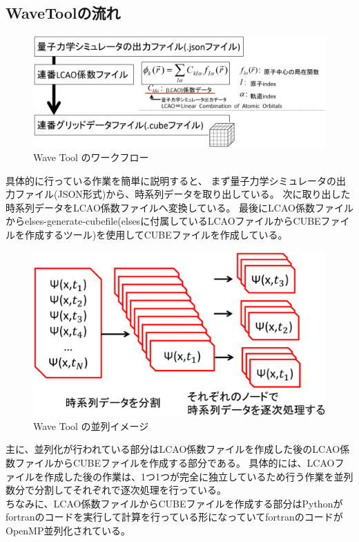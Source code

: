 \documentclass{jsarticle}
\begin{document}
\subsection{WaveToolの流れ}
\begin{figure}[H]
\centering
\includegraphics[width=15cm,clip]{fig/workflow.eps}
\caption{Wave Tool のワークフロー}
\label{fig:work flow}
\end{figure}
具体的に行っている作業を簡単に説明すると、
まず量子力学シミュレータの出力ファイル(JSON形式)から、時系列データを取り出している。
次に取り出した時系列データをLCAO係数ファイルへ変換している。
最後にLCAO係数ファイルからelses-generate-cubefile(elsesに付属しているLCAOファイルからCUBEファイルを作成するツール)を使用してCUBEファイルを作成している。

\begin{figure}[H]
\centering
\includegraphics[width=15cm,clip]{fig/work_imag.eps}
\caption{Wave Tool の並列イメージ}
\label{fig:work image}
\end{figure}
主に、並列化が行われている部分はLCAO係数ファイルを作成した後のLCAO係数ファイルからCUBEファイルを作成する部分である。
具体的には、LCAOファイルを作成した後の作業は、1つ1つが完全に独立しているため行う作業を並列数分で分割してそれぞれで逐次処理を行っている。\\
ちなみに、LCAO係数ファイルからCUBEファイルを作成する部分はPythonがfortranのコードを実行して計算を行っている形になっていてfortranのコードがOpenMP並列化されている。
\end{document}
